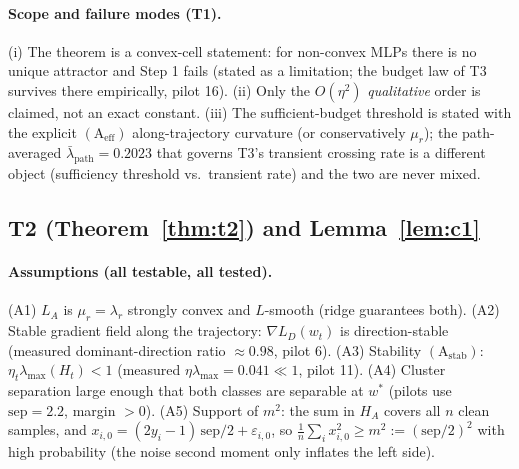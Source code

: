 \documentclass{article}
\newcommand{\lam}{\lambda}
\newcommand{\lampath}{\bar{\lam}_{\mathrm{path}}}
\begin{document}
\paragraph{Scope and failure modes (T1).} (i) The theorem is a convex-cell statement: for
non-convex MLPs there is no unique attractor and Step 1 fails (stated as a limitation; the
budget law of T3 survives there empirically, pilot 16). (ii) Only the $O(\eta^2)$
\emph{qualitative} order is claimed, not an exact constant. (iii) The sufficient-budget
threshold is stated with the explicit $(\mathrm{A}_{\mathrm{eff}})$ along-trajectory curvature
(or conservatively $\mu_r$); the path-averaged $\lampath=0.2023$ that governs T3's transient
crossing rate is a different object (sufficiency threshold vs.\ transient rate) and the two are
never mixed.

\subsection{T2 (Theorem~\ref{thm:t2}) and Lemma~\ref{lem:c1}}
\paragraph{Assumptions (all testable, all tested).}
(A1) $L_A$ is $\mu_r{=}\lambda_r$ strongly convex and $L$-smooth (ridge guarantees both).
(A2) Stable gradient field along the trajectory: $\nabla L_D(w_t)$ is direction-stable
(measured dominant-direction ratio $\approx0.98$, pilot 6).
(A3) Stability $(\mathrm{A}_{\mathrm{stab}})$: $\eta_t\lambda_{\max}(H_t)<1$ (measured
$\eta\lambda_{\max}=0.041\ll1$, pilot 11).
(A4) Cluster separation large enough that both classes are separable at $w^*$ (pilots use
$\mathrm{sep}=2.2$, margin $>0$).
(A5) Support of $m^2$: the sum in $H_A$ covers all $n$ clean samples, and
$x_{i,0}=(2y_i{-}1)\,\mathrm{sep}/2+\varepsilon_{i,0}$, so
$\frac1n\sum_i x_{i,0}^2\ge m^2:=(\mathrm{sep}/2)^2$ with high probability (the noise second
moment only inflates the left side).
\end{document}
